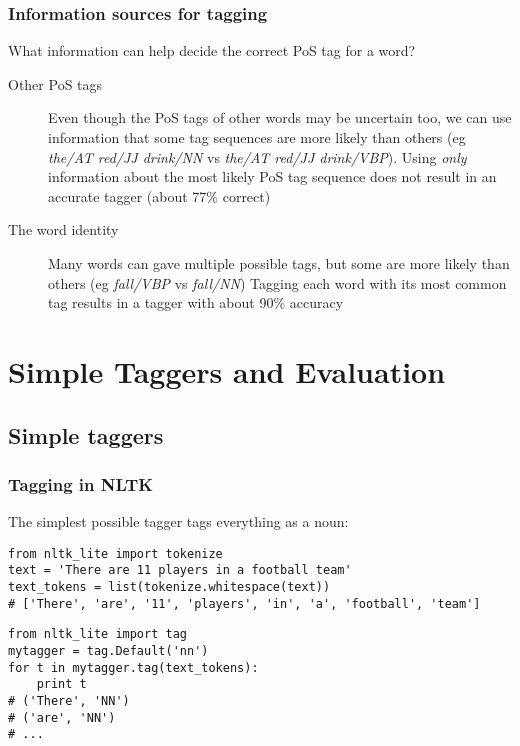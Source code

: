 \documentclass{beamer}             %
\begin{document}

\begin{frame}
  \frametitle{Information sources for tagging}

  What information can help decide the correct PoS tag for a word?
  \begin{description}
  \item[Other PoS tags] Even though the PoS tags of other words may be
    uncertain too, we can use information that some tag sequences are
    more likely than others (eg \emph{the/AT red/JJ drink/NN} vs \emph{the/AT
      red/JJ drink/VBP}).\newline
    Using \emph{only} information about the most likely PoS tag
    sequence does not result in an accurate tagger (about 77\%
    correct)
  \item[The word identity] Many words can gave multiple possible tags,
    but some are more likely than others (eg \emph{fall/VBP} vs
    \emph{fall/NN}) \newline
    Tagging each word with its most common tag results in a tagger
    with about 90\% accuracy
  \end{description}
\end{frame}



\section{Simple Taggers and Evaluation}

\subsection{Simple taggers} 

\begin{frame}[fragile]
  \frametitle{Tagging in NLTK}
The simplest possible tagger tags everything as a noun:
{\small
\begin{verbatim}
from nltk_lite import tokenize
text = 'There are 11 players in a football team'
text_tokens = list(tokenize.whitespace(text))
# ['There', 'are', '11', 'players', 'in', 'a', 'football', 'team']
\end{verbatim}
  \pause
\begin{verbatim}
from nltk_lite import tag
mytagger = tag.Default('nn')
for t in mytagger.tag(text_tokens):
    print t
# ('There', 'NN')
# ('are', 'NN')
# ...
\end{verbatim}}
\end{frame}
\end{document}

